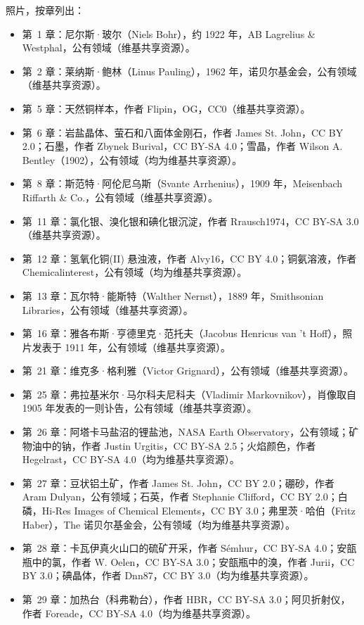 \bigskip
\noindent 照片，按章列出：
\begin{itemize}\small
  \item 第~1 章：尼尔斯·玻尔（Niels Bohr），约 1922 年，AB Lagrelius \& Westphal，公有领域（维基共享资源）。
  \item 第~2 章：莱纳斯·鲍林（Linus Pauling），1962 年，诺贝尔基金会，公有领域（维基共享资源）。
  \item 第~5 章：天然铜样本，作者 Flipin，OG，CC0（维基共享资源）。
  \item 第~6 章：岩盐晶体、萤石和八面体金刚石，作者 James St. John，CC BY 2.0；石墨，作者 Zbynek Burival，CC BY-SA 4.0；雪晶，作者 Wilson A. Bentley（1902），公有领域（均为维基共享资源）。
  \item 第~8 章：斯范特·阿伦尼乌斯（Svante Arrhenius），1909 年，Meisenbach Riffarth \& Co.，公有领域（维基共享资源）。
  \item 第~11 章：氯化银、溴化银和碘化银沉淀，作者 Rrausch1974，CC BY-SA 3.0（维基共享资源）。
  \item 第~12 章：氢氧化铜(II) 悬浊液，作者 Alvy16，CC BY 4.0；铜氨溶液，作者 Chemicalinterest，公有领域（均为维基共享资源）。
  \item 第~13 章：瓦尔特·能斯特（Walther Nernst），1889 年，Smithsonian Libraries，公有领域（维基共享资源）。
  \item 第~16 章：雅各布斯·亨德里克·范托夫（Jacobus Henricus van 't Hoff），照片发表于 1911 年，公有领域（维基共享资源）。
  \item 第~21 章：维克多·格利雅（Victor Grignard），公有领域（维基共享资源）。
  \item 第~25 章：弗拉基米尔·马尔科夫尼科夫（Vladimir Markovnikov），肖像取自 1905 年发表的一则讣告，公有领域（维基共享资源）。
  \item 第~26 章：阿塔卡马盐沼的锂盐池，NASA Earth Observatory，公有领域；矿物油中的钠，作者 Justin Urgitis，CC BY-SA 2.5；火焰颜色，作者 Hegelrast，CC BY-SA 4.0（均为维基共享资源）。
  \item 第~27 章：豆状铝土矿，作者 James St. John，CC BY 2.0；硼砂，作者 Aram Dulyan，公有领域；石英，作者 Stephanie Clifford，CC BY 2.0；白磷，Hi-Res Images of Chemical Elements，CC BY 3.0；弗里茨·哈伯（Fritz Haber），The 诺贝尔基金会，公有领域（均为维基共享资源）。
  \item 第~28 章：卡瓦伊真火山口的硫矿开采，作者 S\'emhur，CC BY-SA 4.0；安瓿瓶中的氯，作者 W. Oelen，CC BY-SA 3.0；安瓿瓶中的溴，作者 Jurii，CC BY 3.0；碘晶体，作者 Dnn87，CC BY 3.0（均为维基共享资源）。
  \item 第~29 章：加热台（科弗勒台），作者 HBR，CC BY-SA 3.0；阿贝折射仪，作者 Foreade，CC BY-SA 4.0（均为维基共享资源）。
\end{itemize}
\clearpage
